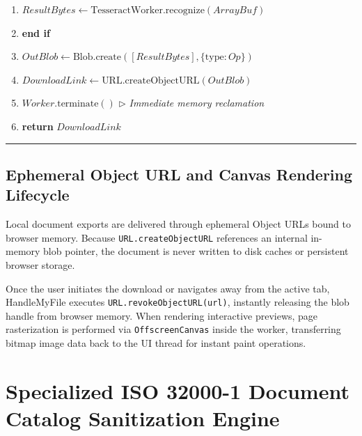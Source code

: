 \documentclass[journal]{IEEEtran}
\begin{document}
\begin{table}[!t]
\begin{minipage}{\columnwidth}
\begin{footnotesize}
\begin{enumerate}[leftmargin=14pt, topsep=2pt, itemsep=1pt]
\item[] \hspace{20pt} $ResultBytes \leftarrow \text{TesseractWorker.recognize}(ArrayBuf)$
\item[] \hspace{10pt} \textbf{end if}
\item[] \hspace{10pt} $OutBlob \leftarrow \text{Blob.create}([ResultBytes], \{\text{type}: Op\})$
\item[] \hspace{10pt} $DownloadLink \leftarrow \text{URL.createObjectURL}(OutBlob)$
\item[] \hspace{10pt} $Worker.\text{terminate}()$ $\triangleright$ \textit{Immediate memory reclamation}
\item[] \hspace{10pt} \textbf{return} $DownloadLink$
\end{enumerate}
\end{footnotesize}
\vspace{-4pt}
\rule{\columnwidth}{0.4pt}
\end{minipage}
\vspace{-10pt}
\end{table}

\subsection{Ephemeral Object URL and Canvas Rendering Lifecycle}
Local document exports are delivered through ephemeral Object URLs bound to browser memory. Because \texttt{URL.createObjectURL} references an internal in-memory blob pointer, the document is never written to disk caches or persistent browser storage. 

Once the user initiates the download or navigates away from the active tab, HandleMyFile executes \texttt{URL.revokeObjectURL(url)}, instantly releasing the blob handle from browser memory. When rendering interactive previews, page rasterization is performed via \texttt{OffscreenCanvas} inside the worker, transferring bitmap image data back to the UI thread for instant paint operations.

\section{Specialized ISO 32000-1 Document Catalog Sanitization Engine}
\end{document}
